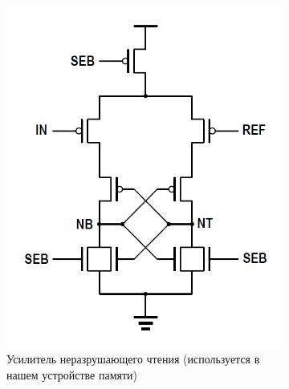 \documentclass[a4paper,12pt]{article} %
\begin{document}
\begin{figure}
  \begin{subfigure}[b]{0.48\textwidth}
    \includegraphics[width=\textwidth]{comparator.png}
    \caption{Усилитель неразрушающего чтения (используется в нашем устройстве памяти)}
    \label{amp:1}
  \end{subfigure}
  \begin{subfigure}[b]{0.5\textwidth}

\end{subfigure}
\end{figure}
\end{document}
